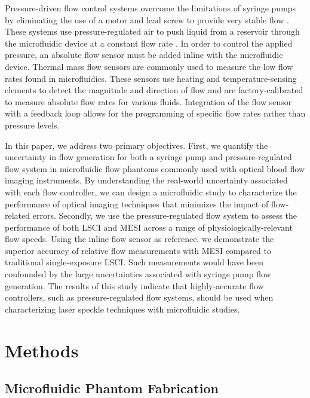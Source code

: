 \documentclass[12pt]{spieman}
\begin{document}
\begin{spacing}{2}
Pressure-driven flow control systems overcome the limitations of syringe pumps by eliminating the use of a motor and lead screw to provide very stable flow \cite{Zhou:2011ey,Li:2014ca,Zeng.2020}. These systems use pressure-regulated air to push liquid from a reservoir through the microfluidic device at a constant flow rate \cite{Zeng.2020}. In order to control the applied pressure, an absolute flow sensor must be added inline with the microfluidic device. Thermal mass flow sensors are commonly used to measure the low flow rates found in microfluidics. These sensors use heating and temperature-sensing elements to detect the magnitude and direction of flow and are factory-calibrated to measure absolute flow rates for various fluids. Integration of the flow sensor with a feedback loop allows for the programming of specific flow rates rather than pressure levels.

In this paper, we address two primary objectives. First, we quantify the uncertainty in flow generation for both a syringe pump and pressure-regulated flow system in microfluidic flow phantoms commonly used with optical blood flow imaging instruments. By understanding the real-world uncertainty associated with each flow controller, we can design a microfluidic study to characterize the performance of optical imaging techniques that minimizes the impact of flow-related errors. Secondly, we use the pressure-regulated flow system to assess the performance of both LSCI and MESI across a range of physiologically-relevant flow speeds. Using the inline flow sensor as reference, we demonstrate the superior accuracy of relative flow measurements with MESI compared to traditional single-exposure LSCI. Such measurements would have been confounded by the large uncertainties associated with syringe pump flow generation. The results of this study indicate that highly-accurate flow controllers, such as pressure-regulated flow systems, should be used when characterizing laser speckle techniques with microfluidic studies.


\section{Methods}
\label{sect:methods}

\subsection{Microfluidic Phantom Fabrication}
\label{sect:methods_phantom}


\end{spacing}
\end{document}
